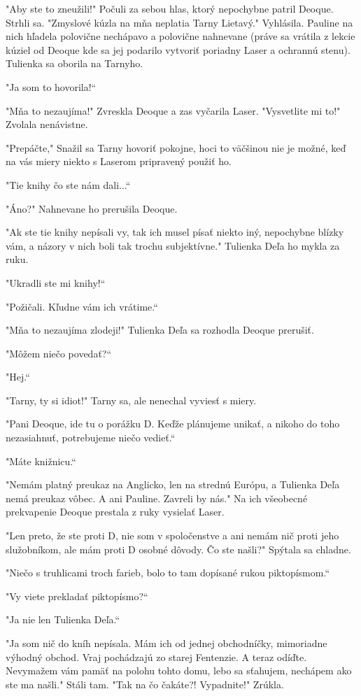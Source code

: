 \documentclass{book}
\begin{document}
"$ $Aby ste to zneužili!"$ $ Počuli za sebou hlas, ktorý nepochybne patril Deoque. Strhli sa. "$ $Zmyslové kúzla na mňa neplatia Tarny Lietavý."$ $ Vyhlásila. Pauline na nich hľadela polovične nechápavo a polovične nahnevane (práve sa vrátila z lekcie kúziel od Deoque kde sa jej podarilo vytvoriť poriadny Laser a ochrannú stenu). Tulienka sa oborila na Tarnyho.

"$ $Ja som to hovorila!“

"$ $Mňa to nezaujíma!"$ $ Zvreskla Deoque a zas vyčarila Laser. "$ $Vysvetlite mi to!"$ $ Zvolala nenávistne.

"$ $Prepáčte,"$ $ Snažil sa Tarny hovoriť pokojne, hoci to väčšinou nie je možné, keď na vás miery niekto s Laserom pripravený použiť ho.

"$ $Tie knihy čo ste nám dali...“

"$ $Áno?"$ $ Nahnevane ho prerušila Deoque.

"$ $Ak ste tie knihy nepísali vy, tak ich musel písať niekto iný, nepochybne blízky vám, a názory v nich boli tak trochu subjektívne."$ $ Tulienka Deľa ho mykla za ruku.

"$ $Ukradli ste mi knihy!“

"$ $Požičali. Kľudne vám ich vrátime.“

"$ $Mňa to nezaujíma zlodeji!"$ $ Tulienka Deľa sa rozhodla Deoque prerušiť.

"$ $Môžem niečo povedať?“

"$ $Hej.“

"$ $Tarny, ty si idiot!"$ $ Tarny sa, ale nenechal vyviesť s miery.

"$ $Pani Deoque, ide tu o porážku D. Keďže plánujeme unikať, a nikoho do toho nezasiahnuť, potrebujeme niečo vedieť.“

"$ $Máte knižnicu.“

"$ $Nemám platný preukaz na Anglicko, len na strednú Európu, a Tulienka Deľa nemá preukaz vôbec. A ani Pauline. Zavreli by nás."$ $ Na ich všeobecné prekvapenie Deoque prestala z ruky vysielať Laser.

"$ $Len preto, že ste proti D, nie som v spoločenstve a ani nemám nič proti jeho služobníkom, ale mám proti D osobné dôvody. Čo ste našli?"$ $ Spýtala sa chladne.

"$ $Niečo s truhlicami troch farieb, bolo to tam dopísané rukou piktopísmom.“

"$ $Vy viete prekladať piktopísmo?“

"$ $Ja nie len Tulienka Deľa.“

"$ $Ja som nič do kníh nepísala. Mám ich od jednej obchodníčky, mimoriadne výhodný obchod. Vraj pochádzajú zo starej Fentenzie. A teraz odíďte. Nevymažem vám pamäť na polohu tohto domu, lebo sa sťahujem, nechápem ako ste ma našli."$ $ Stáli tam. "$ $Tak na čo čakáte?! Vypadnite!"$ $ Zrúkla.
\end{document}
